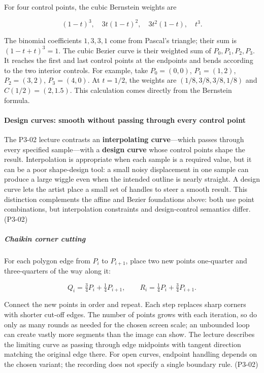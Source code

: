 For four control points, the cubic Bernstein weights are

\[
(1-t)^3,\quad 3t(1-t)^2,\quad 3t^2(1-t),\quad t^3.
\]

The binomial coefficients \(1,3,3,1\) come from Pascal's triangle; their sum is \((1-t+t)^3=1\). The cubic Bezier curve is their weighted sum of \(P_0,P_1,P_2,P_3\). It reaches the first and last control points at the endpoints and bends according to the two interior controls. For example, take \(P_0=(0,0)\), \(P_1=(1,2)\), \(P_2=(3,2)\), \(P_3=(4,0)\). At \(t=1/2\), the weights are \((1/8,3/8,3/8,1/8)\) and \(C(1/2)=(2,1.5)\). This calculation comes directly from the Bernstein formula.

\paragraph{Design curves: smooth without passing through every control point}\label{03-visual-computing-i-ch001-design-curves-smooth-without-passing-through-every-control-point}

\hypertarget{03-visual-computing-i-ch001-design-curves-smooth-without-passing-through-every-control-point}{}

The P3-02 lecture contrasts an \textbf{interpolating curve}---which passes through every specified sample---with a \textbf{design curve} whose control points shape the result. Interpolation is appropriate when each sample is a required value, but it can be a poor shape-design tool: a small noisy displacement in one sample can produce a large wiggle even when the intended outline is nearly straight. A design curve lets the artist place a small set of handles to steer a smooth result. This distinction complements the affine and Bezier foundations above: both use point combinations, but interpolation constraints and design-control semantics differ. (P3-02)

\subparagraph{Chaikin corner cutting}\label{03-visual-computing-i-ch001-chaikin-corner-cutting}

\hypertarget{03-visual-computing-i-ch001-chaikin-corner-cutting}{}

For each polygon edge from \(P_i\) to \(P_{i+1}\), place two new points one-quarter and three-quarters of the way along it:

\[
Q_i=\tfrac34P_i+\tfrac14P_{i+1},\qquad
R_i=\tfrac14P_i+\tfrac34P_{i+1}.
\]

Connect the new points in order and repeat. Each step replaces sharp corners with shorter cut-off edges. The number of points grows with each iteration, so do only as many rounds as needed for the chosen screen scale; an unbounded loop can create vastly more segments than the image can show. The lecture describes the limiting curve as passing through edge midpoints with tangent direction matching the original edge there. For open curves, endpoint handling depends on the chosen variant; the recording does not specify a single boundary rule. (P3-02)

